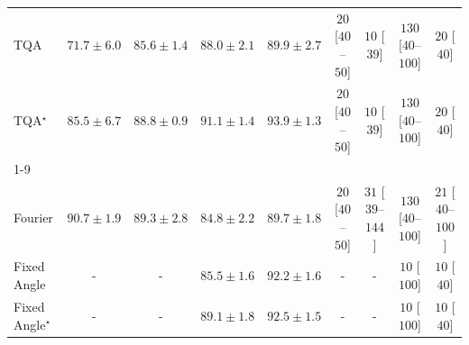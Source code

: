 \begin{tabular}{l|cccc|cccc|}
TQA & {\cellcolor[HTML]{FEECA4}} \color[HTML]{000000} $71.7\pm 6.0$ & {\cellcolor[HTML]{E96D13}} \color[HTML]{F1F1F1} $85.6\pm 1.4$ & {\cellcolor[HTML]{D65808}} \color[HTML]{F1F1F1} $88.0\pm 2.1$ & {\cellcolor[HTML]{C34802}} \color[HTML]{F1F1F1} $89.9\pm 2.7$ & {\cellcolor[HTML]{FFF5F1}} \color[HTML]{000000} $20$ [$40$--$50$] & {\cellcolor[HTML]{FFF7F3}} \color[HTML]{000000} $10$ [$39$] & {\cellcolor[HTML]{FDD6D2}} \color[HTML]{000000} $130$ [$40$--$100$] & {\cellcolor[HTML]{FFF5F1}} \color[HTML]{000000} $20$ [$40$] \\
TQA$^\star$ & {\cellcolor[HTML]{EA6E13}} \color[HTML]{F1F1F1} $85.5\pm 6.7$ & {\cellcolor[HTML]{CF5004}} \color[HTML]{F1F1F1} $88.8\pm 0.9$ & {\cellcolor[HTML]{B44103}} \color[HTML]{F1F1F1} $91.1\pm 1.4$ & {\cellcolor[HTML]{903104}} \color[HTML]{F1F1F1} $93.9\pm 1.3$ & {\cellcolor[HTML]{FFF5F1}} \color[HTML]{000000} $20$ [$40$--$50$] & {\cellcolor[HTML]{FFF7F3}} \color[HTML]{000000} $10$ [$39$] & {\cellcolor[HTML]{FDD6D2}} \color[HTML]{000000} $130$ [$40$--$100$] & {\cellcolor[HTML]{FFF5F1}} \color[HTML]{000000} $20$ [$40$] \\
\cline{1-9}
\multicolumn{9}{c}{\rule{0pt}{8pt}PP} \\
\midrule
Fourier & {\cellcolor[HTML]{167A3F}} \color[HTML]{F1F1F1} $90.7\pm 1.9$ & {\cellcolor[HTML]{228343}} \color[HTML]{F1F1F1} $89.3\pm 2.8$ & {\cellcolor[HTML]{47AE60}} \color[HTML]{F1F1F1} $84.8\pm 2.2$ & {\cellcolor[HTML]{1F8142}} \color[HTML]{F1F1F1} $89.7\pm 1.8$ & {\cellcolor[HTML]{FFF5F1}} \color[HTML]{000000} $20$ [$40$--$50$] & {\cellcolor[HTML]{FFF2EE}} \color[HTML]{000000} $31$ [$39$--$144$] & {\cellcolor[HTML]{FDD6D2}} \color[HTML]{000000} $130$ [$40$--$100$] & {\cellcolor[HTML]{FFF4F0}} \color[HTML]{000000} $21$ [$40$--$100$] \\
Fixed Angle & {\cellcolor[HTML]{000000}} \color[HTML]{F1F1F1} {\cellcolor{white}} \color{black} - & {\cellcolor[HTML]{000000}} \color[HTML]{F1F1F1} {\cellcolor{white}} \color{black} - & {\cellcolor[HTML]{3FA95C}} \color[HTML]{F1F1F1} $85.5\pm 1.6$ & {\cellcolor[HTML]{096F3A}} \color[HTML]{F1F1F1} $92.2\pm 1.6$ & {\cellcolor[HTML]{000000}} \color[HTML]{F1F1F1} {\cellcolor{white}} \color{black} - & {\cellcolor[HTML]{000000}} \color[HTML]{F1F1F1} {\cellcolor{white}} \color{black} - & {\cellcolor[HTML]{FFF7F3}} \color[HTML]{000000} $10$ [$100$] & {\cellcolor[HTML]{FFF7F3}} \color[HTML]{000000} $10$ [$40$] \\
Fixed Angle$^\star$ & {\cellcolor[HTML]{000000}} \color[HTML]{F1F1F1} {\cellcolor{white}} \color{black} - & {\cellcolor[HTML]{000000}} \color[HTML]{F1F1F1} {\cellcolor{white}} \color{black} - & {\cellcolor[HTML]{248644}} \color[HTML]{F1F1F1} $89.1\pm 1.8$ & {\cellcolor[HTML]{066D39}} \color[HTML]{F1F1F1} $92.5\pm 1.5$ & {\cellcolor[HTML]{000000}} \color[HTML]{F1F1F1} {\cellcolor{white}} \color{black} - & {\cellcolor[HTML]{000000}} \color[HTML]{F1F1F1} {\cellcolor{white}} \color{black} - & {\cellcolor[HTML]{FFF7F3}} \color[HTML]{000000} $10$ [$100$] & {\cellcolor[HTML]{FFF7F3}} \color[HTML]{000000} $10$ [$40$] \\

\end{tabular}
